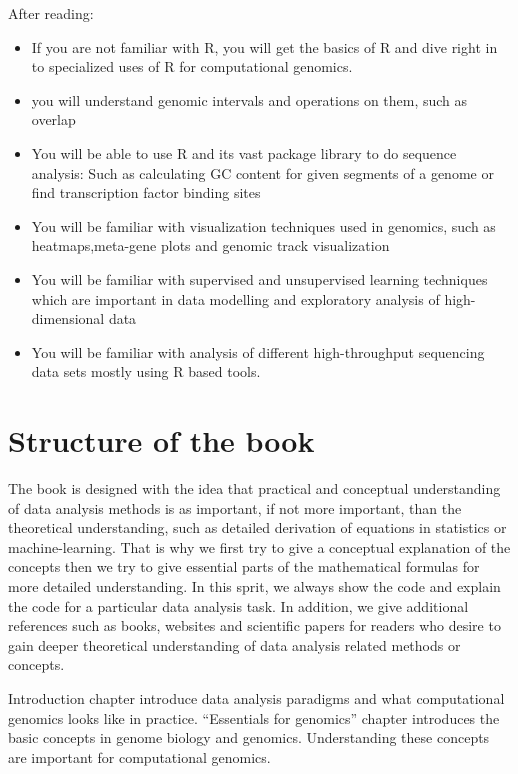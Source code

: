 \documentclass[12pt,]{krantz}
\providecommand{\tightlist}{%
  \setlength{\itemsep}{0pt}\setlength{\parskip}{0pt}}
\theoremstyle{definition}
\theoremstyle{definition}
\theoremstyle{definition}
\theoremstyle{remark}
\begin{document}
After reading:

\begin{itemize}
\tightlist
\item
  If you are not familiar with R, you will get the basics of R and dive
  right in to specialized uses of R for computational genomics.
\item
  you will understand genomic intervals and operations on them, such as
  overlap
\item
  You will be able to use R and its vast package library to do sequence
  analysis: Such as calculating GC content for given segments of a
  genome or find transcription factor binding sites
\item
  You will be familiar with visualization techniques used in genomics,
  such as heatmaps,meta-gene plots and genomic track visualization
\item
  You will be familiar with supervised and unsupervised learning
  techniques which are important in data modelling and exploratory
  analysis of high-dimensional data
\item
  You will be familiar with analysis of different high-throughput
  sequencing data sets mostly using R based tools.
\end{itemize}

\hypertarget{structure-of-the-book}{%
\section*{Structure of the book}\label{structure-of-the-book}}


The book is designed with the idea that practical and conceptual
understanding of data analysis methods is as important, if not more
important, than the theoretical understanding, such as detailed
derivation of equations in statistics or machine-learning. That is why
we first try to give a conceptual explanation of the concepts then we
try to give essential parts of the mathematical formulas for more
detailed understanding. In this sprit, we always show the code and
explain the code for a particular data analysis task. In addition, we
give additional references such as books, websites and scientific papers
for readers who desire to gain deeper theoretical understanding of data
analysis related methods or concepts.

Introduction chapter introduce data analysis paradigms and what
computational genomics looks like in practice. ``Essentials for
genomics'' chapter introduces the basic concepts in genome biology and
genomics. Understanding these concepts are important for computational
genomics.
\end{document}
